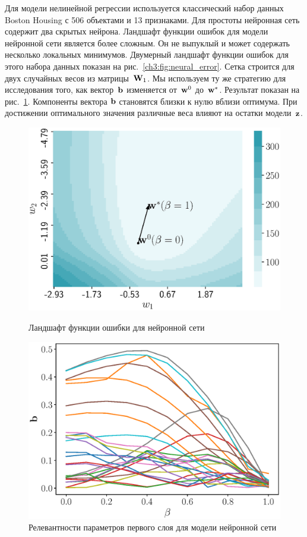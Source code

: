 Для модели нелинейной регрессии используется классический набор данных Boston Housing с 506 объектами и 13 признаками.
Для простоты нейронная сеть содержит два скрытых нейрона.
Ландшафт функции ошибок для модели нейронной сети является более сложным. 
Он не выпуклый и может содержать несколько локальных минимумов.
Двумерный ландшафт функции ошибок для этого набора данных показан на рис.~\ref{ch3:fig:neural_error}. 
Сетка строится для двух случайных весов из матрицы~$\mathbf{W}_1$.
Мы используем ту же стратегию для исследования того, как вектор~$\mathbf{b}$ изменяется от~$\mathbf{w}^0$ до~$\mathbf{w}^*$. 
Результат показан на рис.~\ref{ch3:fig:neural_b_wrt_beta}.
Компоненты вектора $\mathbf{b}$ становятся близки к нулю вблизи оптимума. 
При достижении оптимального значения различные веса влияют на остатки модели~$\mathbf{z}$.
\begin{figure}
	\centering
	\begin{minipage}{.5\textwidth}
		\centering
		\includegraphics[width=\linewidth]{figs/ch3/neural_error}
		\caption{Ландшафт функции ошибки для нейронной сети}
		\label{ch3:fig:neural_error}
	\end{minipage}%
	\begin{minipage}{.5\textwidth}
		\centering
		\includegraphics[width=\linewidth]{figs/ch3/neural_b_wrt_beta}
		\caption{Релевантности параметров первого слоя для модели нейронной сети}
		\label{ch3:fig:neural_b_wrt_beta}
	\end{minipage}
\end{figure}

